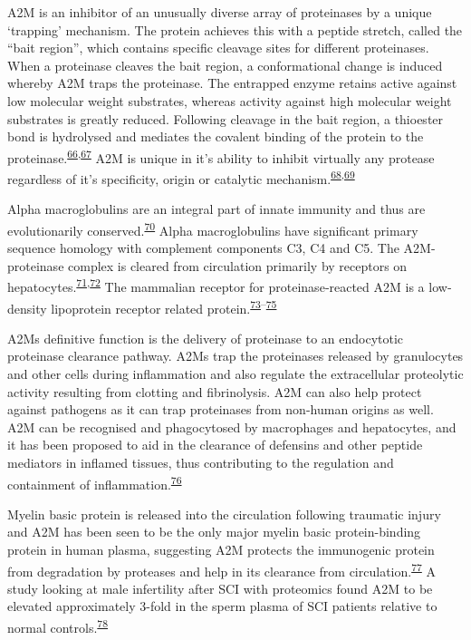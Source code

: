 \documentclass[
]{article}
\begin{document}
A2M is an inhibitor of an unusually diverse array of proteinases by a unique `trapping' mechanism.
The protein achieves this with a peptide stretch, called the ``bait region'', which contains specific cleavage sites for different proteinases.
When a proteinase cleaves the bait region, a conformational change is induced whereby A2M traps the proteinase.
The entrapped enzyme retains active against low molecular weight substrates, whereas activity against high molecular weight substrates is greatly reduced.
Following cleavage in the bait region, a thioester bond is hydrolysed and mediates the covalent binding of the protein to the proteinase.\textsuperscript{\protect\hyperlink{ref-hall_proteolytic_1981}{66},\protect\hyperlink{ref-sottrup-jensen_primary_1984}{67}}
A2M is unique in it's ability to inhibit virtually any protease regardless of it's specificity, origin or catalytic mechanism.\textsuperscript{\protect\hyperlink{ref-khan_oxidized_2004}{68},\protect\hyperlink{ref-lin_n-glycosylation_2012}{69}}

Alpha macroglobulins are an integral part of innate immunity and thus are evolutionarily conserved.\textsuperscript{\protect\hyperlink{ref-buresova_iram2-macroglobulin_2009}{70}}
Alpha macroglobulins have significant primary sequence homology with complement components C3, C4 and C5.
The A2M-proteinase complex is cleared from circulation primarily by receptors on hepatocytes.\textsuperscript{\protect\hyperlink{ref-bond_incorporation_2007}{71},\protect\hyperlink{ref-travis_human_1983}{72}}
The mammalian receptor for proteinase‐reacted A2M is a low‐density lipoprotein receptor related protein.\textsuperscript{\protect\hyperlink{ref-fujiyoshi_amyloid-_2011}{73}--\protect\hyperlink{ref-wyatt_acute_2013}{75}}

A2Ms definitive function is the delivery of proteinase to an endocytotic proteinase clearance pathway.
A2Ms trap the proteinases released by granulocytes and other cells during inflammation and also regulate the extracellular proteolytic activity resulting from clotting and fibrinolysis.
A2M can also help protect against pathogens as it can trap proteinases from non-human origins as well.
A2M can be recognised and phagocytosed by macrophages and hepatocytes, and it has been proposed to aid in the clearance of defensins and other peptide mediators in inflamed tissues, thus contributing to the regulation and containment of inflammation.\textsuperscript{\protect\hyperlink{ref-rehman_alpha-2-macroglobulin_2013}{76}}

Myelin basic protein is released into the circulation following traumatic injury and A2M has been seen to be the only major myelin basic protein-binding protein in human plasma, suggesting A2M protects the immunogenic protein from degradation by proteases and help in its clearance from circulation.\textsuperscript{\protect\hyperlink{ref-gunnarsson_binding_1998}{77}}
A study looking at male infertility after SCI with proteomics found A2M to be elevated approximately 3-fold in the sperm plasma of SCI patients relative to normal controls.\textsuperscript{\protect\hyperlink{ref-silva_towards_2016}{78}}
\end{document}
